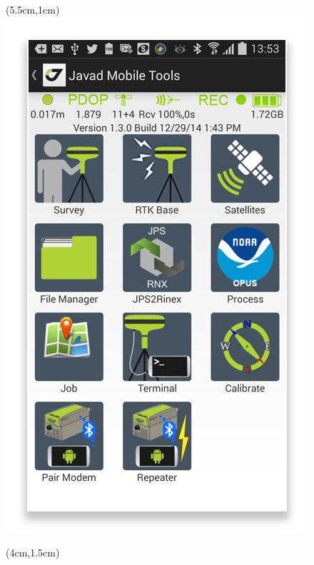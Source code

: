 \documentclass[xetex,t]{beamer}
\begin{document}
\begin{frame}
\begin{textblock*}{3cm}
  \end{textblock*}
  \begin{textblock*}{1.5cm}(5.5cm,1cm)
    \includegraphics[width=\textwidth]{../img/javad-mobile-tools}
  \end{textblock*}
  \begin{textblock*}{3cm}(4cm,1.5cm)

\end{textblock*}
\end{frame}
\end{document}
